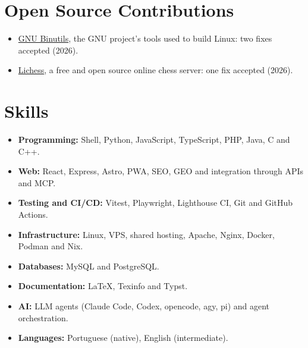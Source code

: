 \documentclass[a4paper,11pt]{article}
\begin{document}

\section{Open Source Contributions}
\begin{itemize}
  \item \href{https://patchwork.sourceware.org/project/binutils/list/?submitter=37677}%
  {GNU Binutils}, the GNU project's tools used to build Linux: two fixes
  accepted (2026).
  \item \href{https://github.com/lichess-org/lila/pull/21832}{Lichess}, a
  free and open source online chess server: one fix accepted (2026).
\end{itemize}


\section{Skills}
\begin{itemize}
  \item \textbf{Programming:} Shell, Python, JavaScript, TypeScript, PHP, Java,
  C and C++.
  \item \textbf{Web:} React, Express, Astro, PWA, SEO, GEO and integration
  through APIs and MCP.
  \item \textbf{Testing and CI/CD:} Vitest, Playwright, Lighthouse CI, Git and
  GitHub Actions.
  \item \textbf{Infrastructure:} Linux, VPS, shared hosting, Apache, Nginx,
  Docker, Podman and Nix.
  \item \textbf{Databases:} MySQL and PostgreSQL.
  \item \textbf{Documentation:} \LaTeX{}, Texinfo and Typst.
  \item \textbf{AI:} LLM agents (Claude Code, Codex, opencode, agy, pi) and
  agent orchestration.
  \item \textbf{Languages:} Portuguese (native), English (intermediate).
\end{itemize}

\end{document}
